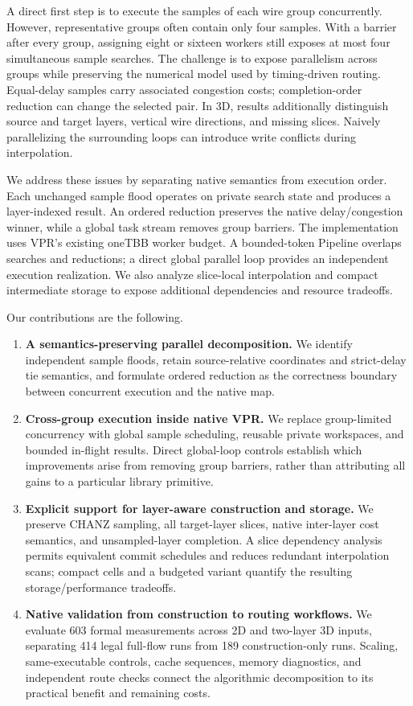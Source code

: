 \documentclass[conference,10pt,letterpaper]{IEEEtran}
\begin{document}
A direct first step is to execute the samples of each wire group concurrently. However, representative groups often contain only four samples. With a barrier after every group, assigning eight or sixteen workers still exposes at most four simultaneous sample searches. The challenge is to expose parallelism across groups while preserving the numerical model used by timing-driven routing. Equal-delay samples carry associated congestion costs; completion-order reduction can change the selected pair. In 3D, results additionally distinguish source and target layers, vertical wire directions, and missing slices. Naively parallelizing the surrounding loops can introduce write conflicts during interpolation.

We address these issues by separating native semantics from execution order. Each unchanged sample flood operates on private search state and produces a layer-indexed result. An ordered reduction preserves the native delay/congestion winner, while a global task stream removes group barriers. The implementation uses VPR's existing oneTBB worker budget. A bounded-token Pipeline overlaps searches and reductions; a direct global parallel loop provides an independent execution realization. We also analyze slice-local interpolation and compact intermediate storage to expose additional dependencies and resource tradeoffs.

Our contributions are the following.
\begin{enumerate}
\item \textbf{A semantics-preserving parallel decomposition.} We identify independent sample floods, retain source-relative coordinates and strict-delay tie semantics, and formulate ordered reduction as the correctness boundary between concurrent execution and the native map.
\item \textbf{Cross-group execution inside native VPR.} We replace group-limited concurrency with global sample scheduling, reusable private workspaces, and bounded in-flight results. Direct global-loop controls establish which improvements arise from removing group barriers, rather than attributing all gains to a particular library primitive.
\item \textbf{Explicit support for layer-aware construction and storage.} We preserve CHANZ sampling, all target-layer slices, native inter-layer cost semantics, and unsampled-layer completion. A slice dependency analysis permits equivalent commit schedules and reduces redundant interpolation scans; compact cells and a budgeted variant quantify the resulting storage/performance tradeoffs.
\item \textbf{Native validation from construction to routing workflows.} We evaluate 603 formal measurements across 2D and two-layer 3D inputs, separating 414 legal full-flow runs from 189 construction-only runs. Scaling, same-executable controls, cache sequences, memory diagnostics, and independent route checks connect the algorithmic decomposition to its practical benefit and remaining costs.
\end{enumerate}
\end{document}
